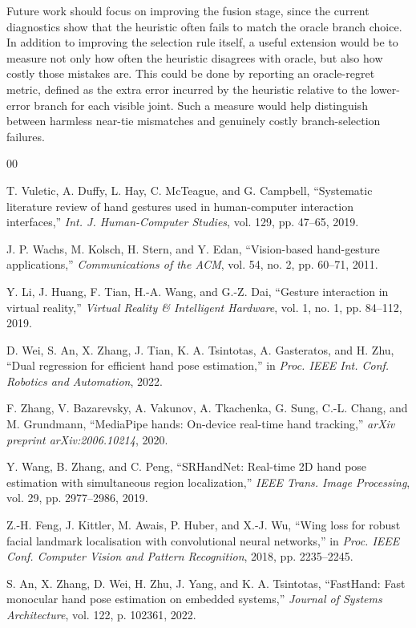 \documentclass[10pt,letterpaper]{article}
\begin{document}
Future work should focus on improving the fusion stage, since the current diagnostics show that the heuristic often fails to match the oracle branch choice. In addition to improving the selection rule itself, a useful extension would be to measure not only how often the heuristic disagrees with oracle, but also how costly those mistakes are. This could be done by reporting an oracle-regret metric, defined as the extra error incurred by the heuristic relative to the lower-error branch for each visible joint. Such a measure would help distinguish between harmless near-tie mismatches and genuinely costly branch-selection failures.

\clearpage
\begin{thebibliography}{00}

T. Vuletic, A. Duffy, L. Hay, C. McTeague, and G. Campbell, ``Systematic literature review of hand gestures used in human-computer interaction interfaces,'' \emph{Int. J. Human-Computer Studies}, vol. 129, pp. 47--65, 2019.

J. P. Wachs, M. Kolsch, H. Stern, and Y. Edan, ``Vision-based hand-gesture applications,'' \emph{Communications of the ACM}, vol. 54, no. 2, pp. 60--71, 2011.

Y. Li, J. Huang, F. Tian, H.-A. Wang, and G.-Z. Dai, ``Gesture interaction in virtual reality,'' \emph{Virtual Reality \& Intelligent Hardware}, vol. 1, no. 1, pp. 84--112, 2019.

D. Wei, S. An, X. Zhang, J. Tian, K. A. Tsintotas, A. Gasteratos, and H. Zhu, ``Dual regression for efficient hand pose estimation,'' in \emph{Proc. IEEE Int. Conf. Robotics and Automation}, 2022.

F. Zhang, V. Bazarevsky, A. Vakunov, A. Tkachenka, G. Sung, C.-L. Chang, and M. Grundmann, ``MediaPipe hands: On-device real-time hand tracking,'' \emph{arXiv preprint arXiv:2006.10214}, 2020.

Y. Wang, B. Zhang, and C. Peng, ``SRHandNet: Real-time 2D hand pose estimation with simultaneous region localization,'' \emph{IEEE Trans. Image Processing}, vol. 29, pp. 2977--2986, 2019.

Z.-H. Feng, J. Kittler, M. Awais, P. Huber, and X.-J. Wu, ``Wing loss for robust facial landmark localisation with convolutional neural networks,'' in \emph{Proc. IEEE Conf. Computer Vision and Pattern Recognition}, 2018, pp. 2235--2245.

S. An, X. Zhang, D. Wei, H. Zhu, J. Yang, and K. A. Tsintotas, ``FastHand: Fast monocular hand pose estimation on embedded systems,'' \emph{Journal of Systems Architecture}, vol. 122, p. 102361, 2022.


\end{thebibliography}
\end{document}
